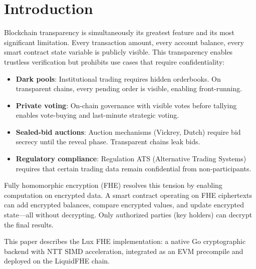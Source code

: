 \section{Introduction}

\label{sec:introduction}

Blockchain transparency is simultaneously its greatest feature and its most
significant limitation. Every transaction amount, every account balance, every
smart contract state variable is publicly visible. This transparency enables
trustless verification but prohibits use cases that require confidentiality:

\begin{itemize}[leftmargin=2em]
  \item \textbf{Dark pools}: Institutional trading requires hidden orderbooks. On
        transparent chains, every pending order is visible, enabling front-running.
  \item \textbf{Private voting}: On-chain governance with visible votes before
        tallying enables vote-buying and last-minute strategic voting.
  \item \textbf{Sealed-bid auctions}: Auction mechanisms (Vickrey, Dutch) require
        bid secrecy until the reveal phase. Transparent chains leak bids.
  \item \textbf{Regulatory compliance}: Regulation ATS (Alternative Trading Systems)
        requires that certain trading data remain confidential from non-participants.
\end{itemize}

Fully homomorphic encryption (FHE) resolves this tension by enabling computation on
encrypted data. A smart contract operating on FHE ciphertexts can add encrypted
balances, compare encrypted values, and update encrypted state---all without
decrypting. Only authorized parties (key holders) can decrypt the final results.

This paper describes the Lux FHE implementation: a native Go cryptographic backend
with NTT SIMD acceleration, integrated as an EVM precompile and deployed on the
LiquidFHE chain.

